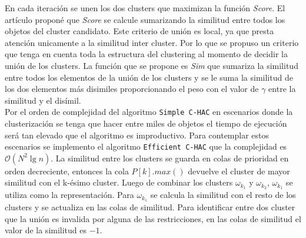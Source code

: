 En cada iteración se unen los dos clusters que maximizan la función \textit{Score}. El artículo \cite{compositeRetrival} proponé que \textit{Score} se calcule sumarizando la similitud entre todos los objetos del cluster candidato. Este criterio de unión es local, ya que presta atención unicamente a la similitud inter cluster. Por lo que se propuso un criterio que tenga en cuenta toda la estructura del clustering al momento de decidir la unión de los clusters. La función que se propone es \textit{Sim} que sumariza la similitud entre todos los elementos de la unión de los clusters y se le suma la similitud de los dos elementos más disimiles proporcionando el peso con el valor de $\gamma$ entre la similitud y el disímil.\\

Por el orden de complejidad del algoritmo \texttt{Simple C-HAC}  en escenarios donde la clusterización se tenga que hacer entre miles de objetos el tiempo de ejecución será tan elevado que el algoritmo es improductivo. Para contemplar estos escenarios se implemento el algoritmo \texttt{Efficient C-HAC} que la complejidad es $\mathcal{O}(N^{2}\lg n)$. La similitud entre los clusters se guarda en colas de prioridad en orden decreciente, entonces la cola $P\left[k\right].max()$ devuelve el cluster de mayor similitud con el k-ésimo cluster. Luego de combinar los clusters $\omega_{k_{1}}$ y $\omega_{k_{2}}$, $\omega_{k_{1}}$ se utiliza como la representación. Para $\omega_{k_{1}}$ se calcula la similitud con el resto de los clusters y se actualiza en las colas de similitud. Para identificar entre dos cluster que la unión es invalida por alguna de las restricciones, en las colas de similitud el valor de la similitud es $-1$.\\

